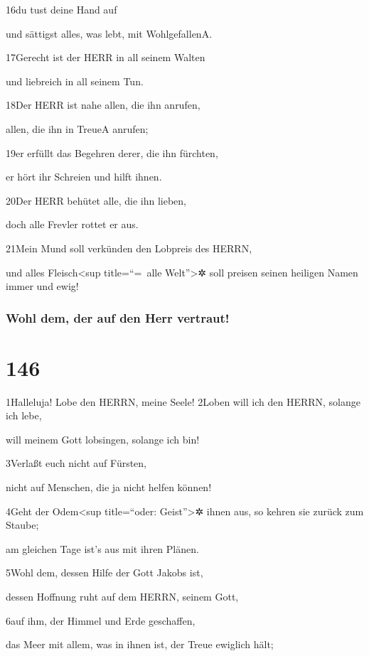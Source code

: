 16du tust deine Hand auf

und sättigst alles, was lebt, mit Wohlgefallen{A}.

17Gerecht ist der HERR in all seinem Walten

und liebreich in all seinem Tun.

18Der HERR ist nahe allen, die ihn anrufen,

allen, die ihn in Treue{A} anrufen;

19er erfüllt das Begehren derer, die ihn fürchten,

er hört ihr Schreien und hilft ihnen.

20Der HERR behütet alle, die ihn lieben,

doch alle Frevler rottet er aus.

21Mein Mund soll verkünden den Lobpreis des HERRN,

und alles Fleisch\textless sup title=``=~alle Welt''\textgreater✲ soll
preisen seinen heiligen Namen immer und ewig!

\hypertarget{wohl-dem-der-auf-den-herr-vertraut}{%
\subsubsection{Wohl dem, der auf den Herr
vertraut!}\label{wohl-dem-der-auf-den-herr-vertraut}}

\hypertarget{section-145}{%
\section{146}\label{section-145}}

1Halleluja! Lobe den HERRN, meine Seele! 2Loben will ich den HERRN,
solange ich lebe,

will meinem Gott lobsingen, solange ich bin!

3Verlaßt euch nicht auf Fürsten,

nicht auf Menschen, die ja nicht helfen können!

4Geht der Odem\textless sup title=``oder: Geist''\textgreater✲ ihnen
aus, so kehren sie zurück zum Staube;

am gleichen Tage ist's aus mit ihren Plänen.

5Wohl dem, dessen Hilfe der Gott Jakobs ist,

dessen Hoffnung ruht auf dem HERRN, seinem Gott,

6auf ihm, der Himmel und Erde geschaffen,

das Meer mit allem, was in ihnen ist, der Treue ewiglich hält;

